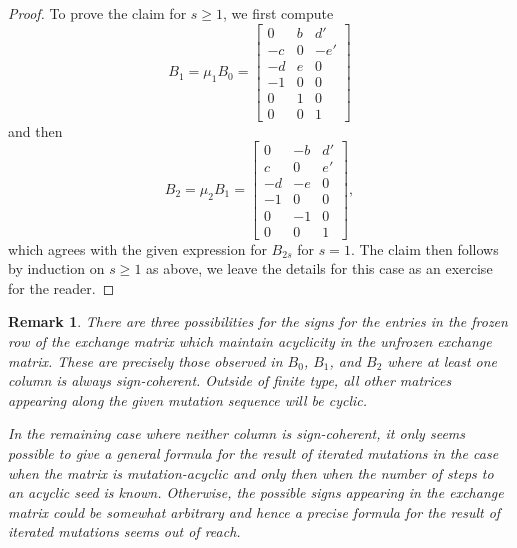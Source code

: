 \documentclass{amsart}
\newtheorem{remark}[theorem]{Remark}
\numberwithin{theorem}{section}
\begin{document}
\begin{proof}
    To prove the claim for $s\ge 1$, we first compute
    \[B_1=\mu_1 B_0=\left[\begin{array}{ccc} 0 & b & d' \\ -c & 0 & -e'\\ -d & e & 0\\ -1 & 0 & 0\\ 0 & 1 & 0\\ 0 & 0 & 1\end{array}\right]\]
    and then
    \[B_2=\mu_2 B_1=\left[\begin{array}{ccc} 0 & -b & d' \\ c & 0 & e'\\ -d & -e & 0\\ -1 & 0 & 0\\ 0 & -1 & 0\\ 0 & 0 & 1\end{array}\right],\]
    which agrees with the given expression for $B_{2s}$ for $s=1$.
    The claim then follows by induction on $s\ge 1$ as above, we leave the details for this case as an exercise for the reader.
  \end{proof}

  \begin{remark}
    There are three possibilities for the signs for the entries in the frozen row of the exchange matrix which maintain acyclicity in the unfrozen exchange matrix.
    These are precisely those observed in $B_0$, $B_1$, and $B_2$ where at least one column is always sign-coherent.
    Outside of finite type, all other matrices appearing along the given mutation sequence will be cyclic.

    In the remaining case where neither column is sign-coherent, it only seems possible to give a general formula for the result of iterated mutations in the case when the matrix is mutation-acyclic and only then when the number of steps to an acyclic seed is known.
    Otherwise, the possible signs appearing in the exchange matrix could be somewhat arbitrary and hence a precise formula for the result of iterated mutations seems out of reach.
  \end{remark}




  
\end{document}
